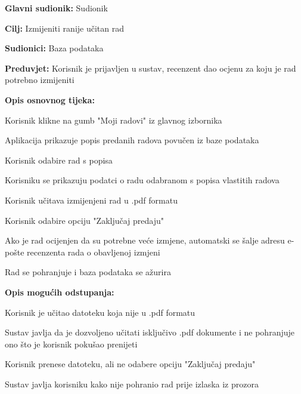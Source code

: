 					\begin{packed_item}
						\item \textbf{Glavni sudionik:} Sudionik
						\item \textbf{Cilj:} Izmijeniti ranije učitan rad
						\item \textbf{Sudionici:} Baza podataka
						\item \textbf{Preduvjet:} Korisnik je prijavljen u sustav, recenzent dao ocjenu za koju je rad potrebno izmijeniti
						
						\item \textbf{Opis osnovnog tijeka:} 
						\item[] \begin{packed_enum}
							
							
							\item Korisnik klikne na gumb "Moji radovi" iz glavnog izbornika
							\item Aplikacija prikazuje popis predanih radova povučen iz baze podataka
							\item Korisnik odabire rad s popisa 
							\item  Korisniku se prikazuju podatci o radu odabranom s popisa vlastitih radova
							\item Korisnik učitava izmijenjeni rad u .pdf formatu
							\item Korisnik odabire opciju "Zaključaj predaju"
							\item Ako je rad ocijenjen da su potrebne veće izmjene, automatski se šalje adresu e-pošte recenzenta rada o obavljenoj izmjeni
							\item Rad se pohranjuje i baza podataka se ažurira
						\end{packed_enum}
						
						\item \textbf{Opis mogućih odstupanja:}
						\item[] \begin{packed_enum}
							\item[5.a] Korisnik je učitao datoteku koja nije u .pdf formatu
							\item[] \begin{packed_enum}
								\item[1.] Sustav javlja da je dozvoljeno učitati isključivo .pdf dokumente i ne pohranjuje ono što je korisnik pokušao prenijeti
							\end{packed_enum}
							
							\item[6.a] Korisnik prenese datoteku, ali ne odabere opciju "Zaključaj predaju"
							\item[] \begin{packed_enum}
								\item[1.] Sustav javlja korisniku kako nije pohranio rad prije izlaska iz prozora
							\end{packed_enum}
							
						\end{packed_enum}
					\end{packed_item}
					
